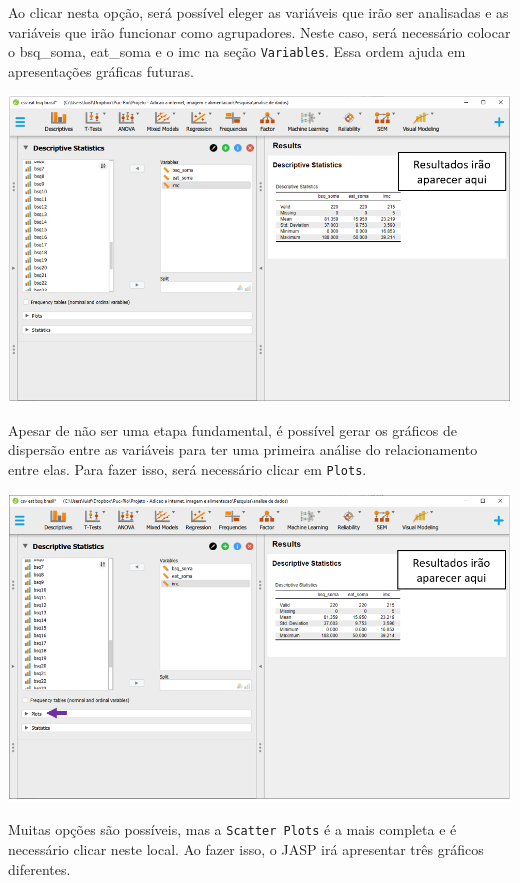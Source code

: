 \documentclass[
]{book}
\begin{document}
Ao clicar nesta opção, será possível eleger as variáveis que irão ser analisadas e as variáveis que irão funcionar como agrupadores. Neste caso, será necessário colocar o bsq\_soma, eat\_soma e o imc na seção \texttt{Variables}. Essa ordem ajuda em apresentações gráficas futuras.

\includegraphics{./img/cap_reg_multipla_descriptives.png}

Apesar de não ser uma etapa fundamental, é possível gerar os gráficos de dispersão entre as variáveis para ter uma primeira análise do relacionamento entre elas. Para fazer isso, será necessário clicar em \texttt{Plots}.

\includegraphics{./img/cap_reg_multipla_plots.png}

Muitas opções são possíveis, mas a \texttt{Scatter\ Plots} é a mais completa e é necessário clicar neste local. Ao fazer isso, o JASP irá apresentar três gráficos diferentes.
\end{document}
